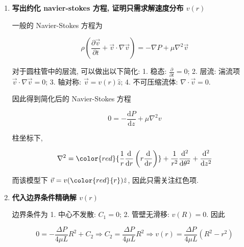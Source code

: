 \documentclass[../../main.tex]{subfiles}
\begin{document}
\begin{enumerate}
这实际形成了一个待解的线性方程组

$$
\begin{aligned}
\mathrm{L^{3}T^{-1}} = \mathrm{(ML^{-2}T^{-2})}^{a} \cdot \mathrm{L}^{b} \cdot \mathrm{(ML^{-1}T^{-1})}^{c} = \mathrm{M}^{a+c} \mathrm{L}^{-2a+b-c} \mathrm{T}^{-2a-c}
\end{aligned}
$$

指数比较:

$$
\begin{cases}
a + c &= 0 \\
-2a + b - c &= 3 \\
-2a - c &= -1
\end{cases}
$$

解得 $a = 1, b = 4, c = -1$. 因此得到 Poiseuille 定律的量纲形式

$$
Q \propto \frac{\Delta P}{L}  \frac{R^{4}}{\mu}
$$

    \item \textbf{写出约化 navier-stokes 方程, 证明只需求解速度分布 $v(r)$}
    
一般的 Navier-Stokes 方程为

$$
\rho \left(\frac{\partial\vec{v}}{\partial t} + \vec{v}\cdot\nabla\vec{v}\right) = -\nabla P + \mu\nabla^{2}\vec{v}
$$

对于圆柱管中的层流, 可以做出以下简化: 1. 稳态: $\frac{\partial}{\partial t} = 0$; 2. 层流: 湍流项 $\vec{v}\cdot\nabla\vec{v} = 0$; 3. 轴对称: $\vec{v} = v(r)\hat{z}$; 4. 不可压缩流体: $\nabla\cdot\vec{v} = 0$.

因此得到简化后的 Navier-Stokes 方程

$$
0 = -\frac{\mathrm{d}P}{\mathrm{d}z} + \mu\nabla^{2}v
$$

柱坐标下, 

$$
\nabla^{2} = {\color{red}{\frac{1}{r}\frac{\mathrm{d}}{\mathrm{d}r}\left(r\frac{\mathrm{d}}{\mathrm{d}r}\right)}} + \frac{1}{r^{2}}\frac{\mathrm{d}^{2}}{\mathrm{d}\theta^{2}} + \frac{\mathrm{d}^{2}}{\mathrm{d}z^{2}}
$$

而该模型下 $\vec{v} = v({\color{red}{r}})\hat{z}$, 因此只需关注红色项.

    \item \textbf{代入边界条件精确解 $v(r)$}
    
边界条件为 1. 中心不发散: $C_{1} = 0$; 2. 管壁无滑移: $v(R) = 0$. 因此

$$
0 = -\frac{\Delta P}{4\mu L}R^{2} + C_{2} \Rightarrow C_{2} = \frac{\Delta P}{4\mu L}R^{2}
\Rightarrow v(r) = \frac{\Delta P}{4\mu L}(R^{2} - r^{2})
$$


\end{enumerate}
\end{document}

